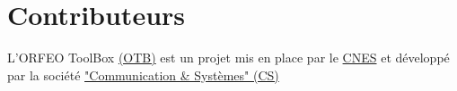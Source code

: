 \chapter*{Contributeurs}
\noindent

L'ORFEO ToolBox \href{http://smsc.cnes.fr/PLEIADES/Fr/A_prog_accomp.htm/}{(OTB)} est un projet mis en place par le \href{http://www.cnes.fr}{CNES} et d\'{e}velopp\'{e} par la 
soci\'{e}t\'{e} \href{http://www.c-s.fr}{"Communication \& Syst\`{e}mes" (CS)}



